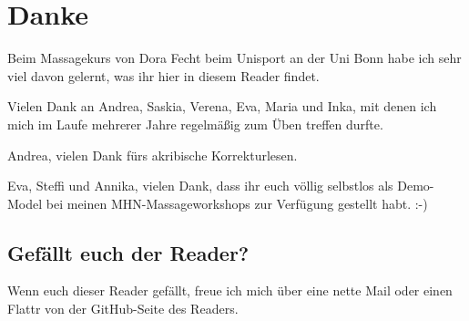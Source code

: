 \section*{Danke}

Beim Massagekurs von Dora Fecht beim Unisport an der Uni Bonn habe ich sehr viel davon gelernt, was ihr hier in diesem Reader findet.

Vielen Dank an Andrea, Saskia, Verena, Eva, Maria und Inka, mit denen ich mich im Laufe mehrerer Jahre regelmäßig zum Üben treffen durfte.

Andrea, vielen Dank fürs akribische Korrekturlesen.

Eva, Steffi und Annika, vielen Dank, dass ihr euch völlig selbstlos als Demo-Model bei meinen MHN-Massageworkshops zur Verfügung gestellt habt. :-)

\subsection*{Gefällt euch der Reader?}

Wenn euch dieser Reader gefällt, freue ich mich über eine nette Mail oder einen Flattr von der GitHub-Seite des Readers.

